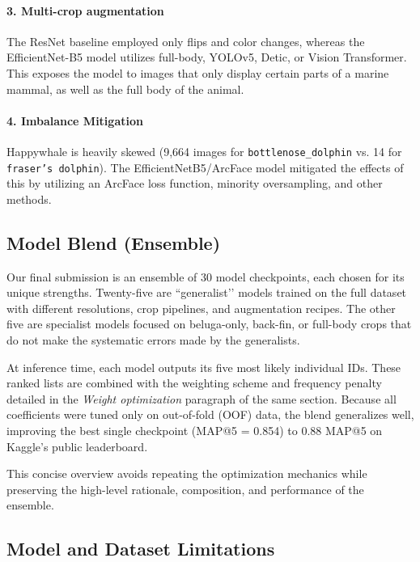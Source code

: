 \documentclass[twocolumn]{article}
\begin{document}
\paragraph{3. Multi-crop augmentation}

The ResNet baseline employed only flips and color changes, whereas the EfficientNet-B5 model utilizes full-body, YOLOv5, Detic, or Vision Transformer. This exposes the model to images that only display certain parts of a marine mammal, as well as the full body of the animal. 

\paragraph{4. Imbalance Mitigation}

Happywhale is heavily skewed (9,664 images for \texttt{bottlenose_dolphin} vs. 14 for \texttt{fraser's dolphin}). The EfficientNetB5/ArcFace model mitigated the effects of this by utilizing an ArcFace loss function, minority oversampling, and other methods. 

\subsection{Model Blend (Ensemble)}

Our final submission is an ensemble of 30 model checkpoints, each chosen for its unique strengths. Twenty-five are “generalist’’ models trained on the full dataset with different resolutions, crop pipelines, and augmentation recipes. The other five are specialist models focused on beluga-only, back-fin, or full-body crops that do not make the systematic errors made by the generalists.

At inference time, each model outputs its five most likely individual IDs. These ranked lists are combined with the weighting scheme and frequency penalty detailed in the \textit{Weight optimization} paragraph of the same section. Because all coefficients were tuned only on out-of-fold (OOF) data, the blend generalizes well, improving the best single checkpoint (MAP@5 = 0.854) to 0.88 MAP@5 on Kaggle’s public leaderboard.

This concise overview avoids repeating the optimization mechanics while preserving the high-level rationale, composition, and performance of the ensemble.

\subsection{Model and Dataset Limitations}
\end{document}
